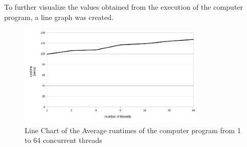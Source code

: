 \documentclass{article}
\begin{document}
\indent To further visualize the values obtained from the execution of the computer program, a line graph was created. 
\begin{figure}[H]
    \includegraphics[width=0.8\textwidth]{chart01.png}
    \centering
    \caption{Line Chart of the Average runtimes of the computer program from 1 to 64 concurrent threads}
    \end{figure}
\end{document}
